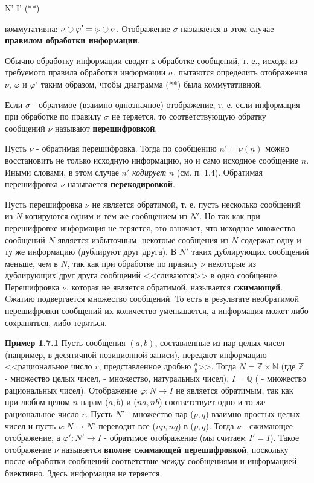 \documentclass[12pt]{report}
\begin{document}
{\begin{math*}
     
    \qquad \qquad {\nu}\shortdownarrow \qquad \shortdownarrow{\sigma}

     
   \qquad \quad \qquad N'  I' \qquad \qquad \qquad \qquad \qquad \qquad \qquad \qquad \qquad \qquad \qquad \quad \eqno(**)
   \newline
   
\end{math*}
коммутативна: $\nu \ocircle \varphi' = \varphi \ocircle \sigma$. Отображение $\sigma$ называется в этом случае \textbf{правилом обработки информации}.


Обычно обработку информации сводят к обработке сообщений, т. е., исходя из требуемого правила обработки информации $\sigma$, пытаются определить отображения $\nu$, $\varphi$ и $\varphi'$ таким образом, чтобы диаграмма (**) была коммутативной.


Если $\sigma$ - обратимое (взаимно однозначное) отображение, т. е. если информация при обработке по правилу $\sigma$ не теряется, то соответствующую обратку сообщений $\nu$ называют \textbf{перешифровкой}.


Пусть $\nu$ - обратимая перешифровка. Тогда по сообщению $n' = \nu(n)$ можно восстановить не только исходную информацию, но и само исходное сообщение $n$. Иными словами, в этом случае $n'$ \textit{кодирует} $n$ (см. п. 1.4). Обратимая перешифровка $\nu$ называется \textbf{перекодировкой}.


Пусть перешифровка $\nu$ не является обратимой, т. е. пусть несколько сообщений из $N$ копируются одним и тем же сообщением из $N'$. Но так как при перешифровке информация не теряется, это означает, что исходное множество сообщений $N$ является избыточным: некотоые сообщения из $N$ содержат одну и ту же информацию (дублируют друг друга). В $N'$ таких дублирующих сообщений меньше, чем в $N$, так как при обработке по правилу $\nu$ некоторые из дублирующих друг друга сообщений <<сливаются>> в одно сообщение. Перешифровка $\nu$, которая не является обратимой, называется \textbf{сжимающей}. Cжатию подвергается множество сообщений. То есть в результате необратимой перешифровки сообщений их количество уменьшается, а информация может либо сохраняться, либо теряться.


\textbf{Пример 1.7.1} Пусть сообщения $(a,b)$, составленные из пар целых чисел (например, в десятичной позиционной записи), передают информацию <<рациональное число $r$, представленное дробью $\frac{a}{b}$>>. Тогда $N = \mathds{Z} \times \mathds{N}$ (где $\mathds{Z}$ - множество целых чисел,  - множество, натуральных чисел), $I = \mathds{Q}$ ( - множество рациональных чисел). Отображение $\varphi:N \to I$ не является обратимым, так как при любом целом $n$ парам ($a,b$) и ($na,nb$) соответствует одно и то же рациональное число $r$. Пусть $N'$ - множество пар ($p, q$) взаимно простых целых чисел и пусть $\nu:N \to N'$ переводит все ($np,nq$) в ($p,q$). Тогда $\nu$ - сжимающее отображение, а $\varphi':N' \to I$ - обратимое отображение (мы считаем $I' = I$). Такое отображение $\nu$ называется \textbf{вполне сжимающей перешифровкой}, поскольку после обработки сообщений соответствие между сообщениями и информацией биективно. Здесь информация не теряется.


}
\end{document}
